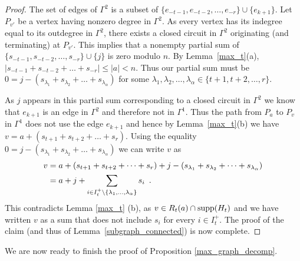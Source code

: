 \documentclass{amsproc}
\theoremstyle{definition}
\theoremstyle{remark}
\numberwithin{equation}{section}
\newcommand{\supp}{{\rm supp}}
\begin{document}
\begin{proof}
The set of edges of $\Gamma^2$ is a subset of $\{e_{-t-1},e_{-t-2},\dots,e_{-r}\}\cup\{e_{k+1}\}$. Let $P_{v'}$ be a vertex having nonzero degree in $\Gamma^2$. As every vertex has its indegree equal to its outdegree in $\Gamma^2$, there exists a closed circuit in $\Gamma^2$ originating (and terminating) at
$P_{v'}$. This implies that a nonempty partial sum of $\{s_{-t-1},s_{-t-2},\dots,s_{-r}\}\cup \{j\}$ is zero modulo $n$. By Lemma~\ref{max_t}(a), $|s_{-t-1}+s_{-t-2}+\dots+s_{-r}|\leqslant |a|<n$. Thus our partial sum must be $0=j-(s_{\lambda_1}+s_{\lambda_2}+\dots+s_{\lambda_\alpha})$ for some $\lambda_1,\lambda_2,\dots,\lambda_{\alpha}\in\{t+1,t+2,\dots,r\}$.

As $j$ appears in this partial sum corresponding to a closed circuit in $\Gamma^2$ we know that $e_{k+1}$ is an edge in $\Gamma^2$ and therefore not in $\Gamma^1$. Thus the path from $P_a$ to $P_v$ in $\Gamma^1$ does not use the edge $e_{k+1}$ and hence by Lemma~\ref{max_t}(b) we have $v=a+(s_{t+1}+s_{t+2}+\dots+s_r)$. Using the equality $0=j-(s_{\lambda_1}+s_{\lambda_2}+\dots+s_{\lambda_\alpha})$ we can write $v$ as
\begin{align*}
v&=a+(s_{t+1}+s_{t+2}+\dots+s_r)+j-(s_{\lambda_1}+s_{\lambda_2}+\dots+s_{\lambda_\alpha})\\
&=a+j+\sum_{i\in I_t^+\setminus\{\lambda_1,\dots,\lambda_\alpha\}}s_i\enskip .
\end{align*}
This contradicts Lemma \ref{max_t} (b), as $v\in R_t(a)\cap\supp(H_t)$ and we have written $v$ as a sum that does not include $s_i$ for every $i\in I_t^+$. 
The proof of the claim (and thus of Lemma~\ref{subgraph_connected}) is now complete.
\end{proof}

We are now ready to finish the proof of Proposition \ref{max_graph_decomp}.
\end{document}
